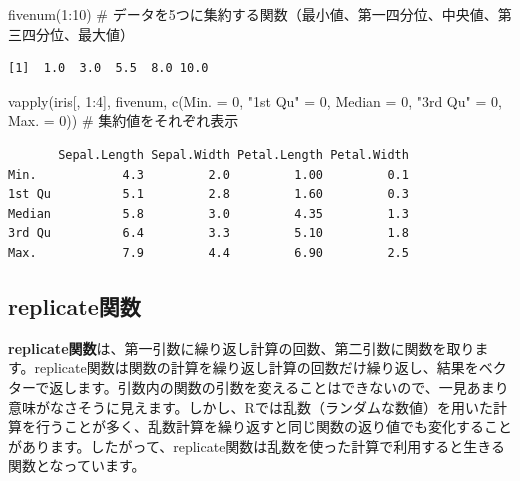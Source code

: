 \documentclass[
  letterpaper,
  DIV=11,
  numbers=noendperiod]{scrreprt}
\newenvironment{Shaded}{\begin{snugshade}}{\end{snugshade}}
\newcommand{\AttributeTok}[1]{\textcolor[rgb]{0.40,0.45,0.13}{#1}}
\newcommand{\CommentTok}[1]{\textcolor[rgb]{0.37,0.37,0.37}{#1}}
\newcommand{\DecValTok}[1]{\textcolor[rgb]{0.68,0.00,0.00}{#1}}
\newcommand{\FunctionTok}[1]{\textcolor[rgb]{0.28,0.35,0.67}{#1}}
\newcommand{\NormalTok}[1]{\textcolor[rgb]{0.00,0.23,0.31}{#1}}
\newcommand{\OtherTok}[1]{\textcolor[rgb]{0.00,0.23,0.31}{#1}}
\newcommand{\SpecialCharTok}[1]{\textcolor[rgb]{0.37,0.37,0.37}{#1}}
\newcommand{\StringTok}[1]{\textcolor[rgb]{0.13,0.47,0.30}{#1}}
\begin{document}
\begin{Shaded}
\begin{Highlighting}[]
\FunctionTok{fivenum}\NormalTok{(}\DecValTok{1}\SpecialCharTok{:}\DecValTok{10}\NormalTok{) }\CommentTok{\# データを5つに集約する関数（最小値、第一四分位、中央値、第三四分位、最大値）}
\end{Highlighting}
\end{Shaded}

\begin{verbatim}
[1]  1.0  3.0  5.5  8.0 10.0
\end{verbatim}

\begin{Shaded}
\begin{Highlighting}[]
\FunctionTok{vapply}\NormalTok{(iris[, }\DecValTok{1}\SpecialCharTok{:}\DecValTok{4}\NormalTok{], fivenum, }\FunctionTok{c}\NormalTok{(}\AttributeTok{Min. =} \DecValTok{0}\NormalTok{, }\StringTok{"1st Qu"} \OtherTok{=} \DecValTok{0}\NormalTok{, }\AttributeTok{Median =} \DecValTok{0}\NormalTok{, }\StringTok{"3rd Qu"} \OtherTok{=} \DecValTok{0}\NormalTok{, }\AttributeTok{Max. =} \DecValTok{0}\NormalTok{)) }\CommentTok{\# 集約値をそれぞれ表示}
\end{Highlighting}
\end{Shaded}

\begin{verbatim}
       Sepal.Length Sepal.Width Petal.Length Petal.Width
Min.            4.3         2.0         1.00         0.1
1st Qu          5.1         2.8         1.60         0.3
Median          5.8         3.0         4.35         1.3
3rd Qu          6.4         3.3         5.10         1.8
Max.            7.9         4.4         6.90         2.5
\end{verbatim}

\hypertarget{replicateux95a2ux6570}{%
\subsection{replicate関数}\label{replicateux95a2ux6570}}

\textbf{replicate関数}は、第一引数に繰り返し計算の回数、第二引数に関数を取ります。replicate関数は関数の計算を繰り返し計算の回数だけ繰り返し、結果をベクターで返します。引数内の関数の引数を変えることはできないので、一見あまり意味がなさそうに見えます。しかし、Rでは乱数（ランダムな数値）を用いた計算を行うことが多く、乱数計算を繰り返すと同じ関数の返り値でも変化することがあります。したがって、replicate関数は乱数を使った計算で利用すると生きる関数となっています。
\end{document}
